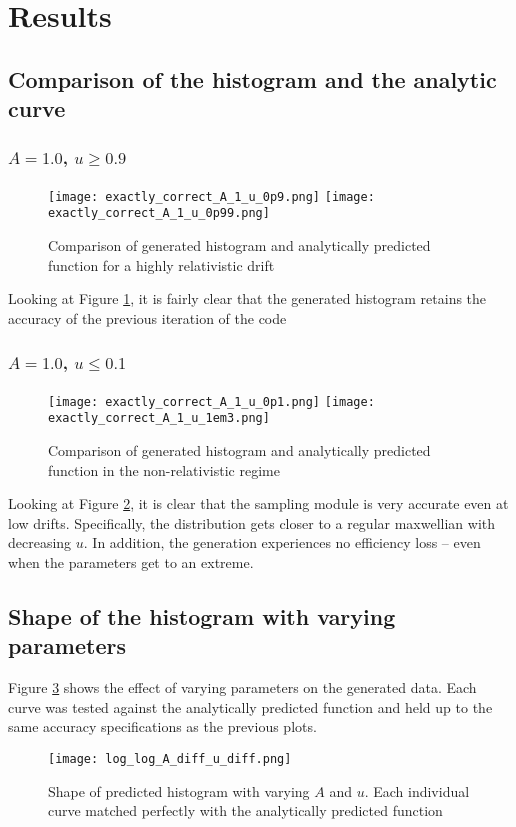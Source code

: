 \documentclass[english]{article}
\begin{document}
\section{Results}
\subsection{Comparison of the histogram and the analytic curve}
\subsubsection{$A=1.0$, $u\geq0.9$}
\begin{figure}[h]
	\centering
	\texttt{[image: exactly\_correct\_A\_1\_u\_0p9.png]}
	\texttt{[image: exactly\_correct\_A\_1\_u\_0p99.png]}
	\caption{Comparison of generated histogram and analytically predicted function for a highly relativistic drift}
	\label{fig:high_u}
\end{figure}
Looking at Figure \ref{fig:high_u}, it is fairly clear that the generated 
histogram retains the accuracy of the previous iteration of the code
\subsubsection{$A=1.0$, $u\leq0.1$}
\begin{figure}[h]
	\centering
	\texttt{[image: exactly\_correct\_A\_1\_u\_0p1.png]}
	\texttt{[image: exactly\_correct\_A\_1\_u\_1em3.png]}
	\caption{Comparison of generated histogram and analytically predicted function in the non-relativistic regime}
	\label{fig:low_u}
\end{figure}
Looking at Figure \ref{fig:low_u}, it is clear that the sampling module is very 
accurate even at low drifts. Specifically, the distribution gets closer to a
regular maxwellian with decreasing $u$.
In addition, the generation experiences no efficiency loss -- even when the
parameters get to an extreme.

\subsection{Shape of the histogram with varying parameters}
Figure \ref{fig:comparison_diff_A_u} shows the effect of varying parameters on the generated data. Each curve was tested against the analytically predicted function and held up to the same accuracy specifications as the previous plots.
\begin{figure}[h]
	\centering
	\texttt{[image: log\_log\_A\_diff\_u\_diff.png]}
	\caption{Shape of predicted histogram with varying $A$ and $u$. Each individual curve matched perfectly with the analytically predicted function}
	\label{fig:comparison_diff_A_u}
\end{figure}
\end{document}
